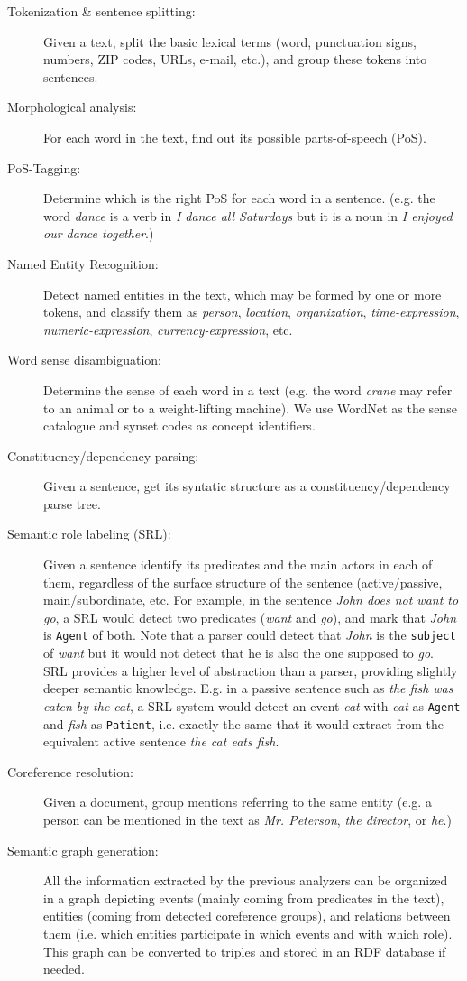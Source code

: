\begin{description}
\item[Tokenization \& sentence splitting:] Given a text, split the basic lexical
  terms (word, punctuation signs, numbers, ZIP codes, URLs, e-mail, etc.), and
  group these tokens into sentences.
\item[Morphological analysis:] For each word in the text, find out its possible
  parts-of-speech (PoS).
\item[PoS-Tagging:] Determine which is the right PoS for each word in a
  sentence. (e.g. the word \textit{dance} is a verb in \textit{I dance all
    Saturdays} but it is a noun in \textit{I enjoyed our dance together}.)
\item[Named Entity Recognition:] Detect named entities in the text, which may be
  formed by one or more tokens, and classify them as \textit{person},
  \textit{location}, \textit{organization}, \textit{time-expression},
  \textit{numeric-expression}, \textit{currency-expression}, etc.
\item[Word sense disambiguation:] Determine the sense of each word in a text
  (e.g. the word \textit{crane} may refer to an animal or to a weight-lifting
  machine). We use WordNet \cite{fellbaum98} as the sense catalogue and synset
  codes as concept identifiers.
\item[Constituency/dependency parsing:] Given a sentence, get its syntatic
  structure as a constituency/dependency parse tree.
\item[Semantic role labeling (SRL):] Given a sentence identify its predicates and the
  main actors in each of them, regardless of the surface structure of the
  sentence (active/passive, main/subordinate, etc. For example, in the sentence
  \textit{John does not want to go}, a SRL would detect two predicates
  (\textit{want} and \textit{go}), and mark that \textit{John} is \texttt{Agent}
  of both. Note that a parser could detect that \textit{John} is the
  \texttt{subject} of \textit{want} but it would not detect that he is also the
  one supposed to \textit{go}.  SRL provides a higher level of abstraction than
  a parser, providing slightly deeper semantic knowledge. E.g. in a passive
  sentence such as \textit{the fish was eaten by the cat}, a SRL system would
  detect an event \textit{eat} with \textit{cat} as \texttt{Agent} and
  \textit{fish} as \texttt{Patient}, i.e. exactly the same that it would extract
  from the equivalent active sentence \textit{the cat eats fish}.
\item[Coreference resolution:] Given a document, group mentions referring to the same entity (e.g. a person can be mentioned in the text as \textit{Mr. Peterson}, \textit{the director}, or \textit{he}.) 
\item[Semantic graph generation:] All the information extracted by the previous
  analyzers can be organized in a graph depicting events (mainly coming from
  predicates in the text), entities (coming from detected coreference groups),
  and relations between them (i.e. which entities participate in which events
  and with which role). This graph can be converted to triples and stored in an
  RDF database if needed.
\end{description}

